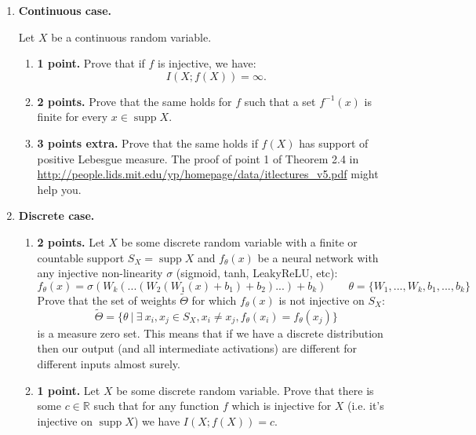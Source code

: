 \documentclass{article}
\DeclareMathOperator{\supp}{supp}
\begin{document}
\begin{enumerate}
    \item \textbf{Continuous case.}
    
    Let $X$ be a continuous random variable.
    \begin{enumerate}
        \item \textbf{1 point.} 
        Prove that if $f$ is injective, we have:
        \[
            I(X; f(X)) = \infty.
        \]
        
        \item \textbf{2 points.} 
        Prove that the same holds for $f$ such that a set $f^{-1}(x)$ is finite for every $x \in \supp{X}$.
        
        \item \textbf{3 points extra.}
        Prove that the same holds if $f(X)$ has support of positive Lebesgue measure.
        The proof of point 1 of Theorem 2.4 in \url{http://people.lids.mit.edu/yp/homepage/data/itlectures_v5.pdf} might help you.
        
    \end{enumerate}
        
    \item \textbf{Discrete case.}
    
    \begin{enumerate}
        \item \textbf{2 points.} 
        Let $X$ be some discrete random variable with a finite or countable support $S_X = \supp{X}$ and $f_\theta(x)$ be a neural network with any injective non-linearity $\sigma$ (sigmoid, tanh, LeakyReLU, etc):
        \[
        f_\theta(x) = \sigma(W_k(...(W_2( W_1(x) + b_1) + b_2)...) + b_k) \qquad \theta = \{W_1, ..., W_k, b_1, ..., b_k \}
        \]
        Prove that the set of weights $\tilde{\Theta}$ for which $f_\theta(x)$ is not injective on $S_X$:
        \[
        \tilde{\Theta} = \{ \theta \ |\ \exists\ x_i, x_j \in S_X, x_i \neq x_j, f_\theta(x_i) = f_\theta(x_j) \}
        \]
        is a measure zero set.
        This means that if we have a discrete distribution then our output (and all intermediate activations) are different for different inputs almost surely.
    
        \item \textbf{1 point.} 
        Let $X$ be some discrete random variable. Prove that there is some $c \in \mathbb{R}$ such that for any function $f$ which is injective for $X$ (i.e. it's injective on $\supp{X}$) we have $I(X; f(X)) = c$.
    \end{enumerate}

\end{enumerate}
\end{document}
